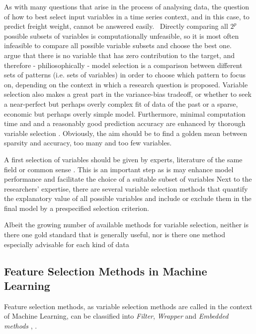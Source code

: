 \documentclass[a4paper, 11pt]{article}
\begin{document}
As with many questions that arise in the process of analysing data, the question of how to best select input variables in a time series context, and in this case, to predict freight weight, cannot be answered easily. \ 
Directly comparing all $2^p$ possible subsets of variables is computationally unfeasible, so it is most often infeasible to compare all possible variable subsets and choose the best one. 
\\
\cite{Wit.2012} argue that there is no variable that has zero contribution to the target, and therefore - philiosophically - model selection is a comparison between different sets of patterns (i.e. sets of variables) in order to choose which pattern to focus on, depending on the context in which a research question is proposed. Variable selection also makes a great part in the variance-bias tradeoff, or whether to seek a near-perfect  but perhaps overly complex fit of data of the past or a sparse, economic but perhaps overly simple model. Furthermore, minimal computation time and and a reasonably good prediction accuracy are enhanced by thorough variable selection \citep{Saeys.2007}.  Obviously, the aim should be to find a golden mean between sparsity and accuracy, too many and too few variables. 

A first selection of variables should be given by experts, literature of the same field or common sense \citep{Heinze.2018}. This is an important step as is may enhance model performance and facilitate the choice of a suitable subset of variables \citep{BenIshak.2016}
Next to the researchers' expertise, there are several variable selection methods that quantify the explanatory value of all possible variables and include or exclude them in the final model by a prespecified selection criterion.\


Albeit the growing number of available methods for variable selection, neither is there one gold standard that is generally useful, nor is there one method especially advisable for each kind of data \citep{Taghizadeh.2017}\\

\subsection{Feature Selection Methods in Machine Learning}
Feature selection methods, as variable selection methods are called in the context of Machine Learning, can be classified into \textit{Filter}, \textit{Wrapper} and \textit{Embedded methods} \citep{Chandrashekar.2014}, . \
\end{document}
